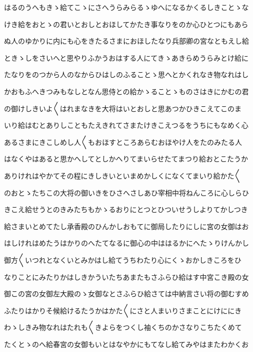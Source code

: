\documentclass[a4paper,11pt,landscape]{ltjtarticle}
\begin{document}
\par\medskip
はるのうへもきゝ給てこゝにさへうらみらるゝゆへになるかくるしきことゝな
\par\medskip
けき給をおとゝの君いとおしとおほしてかたき事なりをのか心ひとつにもあら
\par\medskip
ぬ人のゆかりに内にも心をきたるさまにおほしたなり兵部卿の宮なともえし給
\par\medskip
ときゝしをさいへと思やりふかうおはする人にてきゝあきらめうらみとけ給に
\par\medskip
たなりをのつから人のなからひはしのふることゝ思へとかくれなき物なれはし
\par\medskip
かおもふへきつみもなしとなん思侍との給かゝることゝものさはきにかむの君
\par\medskip
の御けしきいよ〱はれまなきを大将はいとおしと思あつかひきこえてこのま
\par\medskip
いり給はむとありしこともたえきれてさまたけきこえつるをうちにもなめく心
\par\medskip
あるさまにきこしめし人〱もおほすところあらむおほやけ人をたのみたる人
\par\medskip
はなくやはあると思かへしてとしかへりてまいらせたてまつり給おとこたうか
\par\medskip
ありけれはやかてその程にきしきいといまめかしくになくてまいり給かた〱
\par\medskip
のおとゝたちこの大将の御いきをひさへさしあひ宰相中将ねんころに心しらひ
\par\medskip
きこえ給せうとのきみたちもかゝるおりにとつとひついせうしよりてかしつき
\par\medskip
給さまいとめてたし承香殿のひんかしおもてに御局したりにしに宮の女御はお
\par\medskip
はしけれはめたうはかりのへたてなるに御心の中ははるかにへたゝりけんかし
\par\medskip
御方〱いつれとなくいとみかはし給てうちわたり心にくゝおかしきころをひ
\par\medskip
なりことにみたりかはしきかういたちあまたもさふらひ給はす中宮こき殿の女
\par\medskip
御この宮の女御左大殿のゝ女御なとさふらひ給さては中納言さい将の御むすめ
\par\medskip
ふたりはかりそ候給けるたうかはかた〱にさと人まいりさまことにけににき
\par\medskip
わゝしきみ物なれはたれも〱きよらをつくし袖くちのかさなりこちたくめて
\par\medskip
たくとゝのへ給春宮の女御もいとはなやかにもてなし給てみやはまたわかくお
\par\medskip
\end{document}
